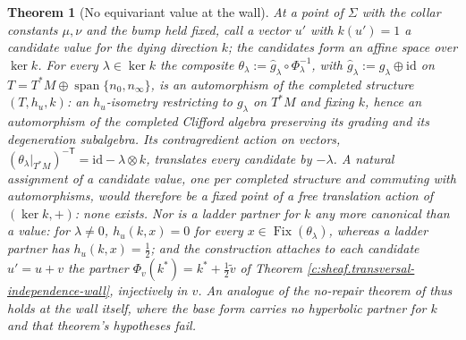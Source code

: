 \documentclass[11pt]{article}
\newtheorem{theorem}{Theorem}[section]
\theoremstyle{definition}
\theoremstyle{plain}
\newcommand{\changedmark}[2]{\marginpar{\raggedright\scriptsize\color{#1}#2}}
\providecommand{\Sig}{}\renewcommand{\Sig}{\Sigma}
\providecommand{\id}{}\renewcommand{\id}{\mathrm{id}}
\providecommand{\nInf}{}\renewcommand{\nInf}{n_\infty}
\providecommand{\nO}{}\renewcommand{\nO}{n_0}
\begin{document}
\begin{theorem}[No equivariant value at the wall]\label{c:sheaf.no-equivariant-value-wall}
\changedmark{gray}{reworded}
At a point of $\Sig$ with the collar constants $\mu, \nu$ and the bump held fixed, call a vector $u'$ with $k(u') = 1$ a \emph{candidate value} for the dying direction $k$; the candidates form an affine space over $\ker k$. For every $\lambda \in \ker k$ the composite $\theta_\lambda := \hat g_\lambda \circ \Phi_\lambda^{-1}$, with $\hat g_\lambda := g_\lambda \oplus \id$ on $T = T^*M \oplus \operatorname{span}\{\nO, \nInf\}$, is an automorphism of the completed structure $(T, h_u, k)$: an $h_u$-isometry restricting to $g_\lambda$ on $T^*M$ and fixing $k$, hence an automorphism of the completed Clifford algebra preserving its grading and its degeneration subalgebra. Its contragredient action on vectors, $(\theta_\lambda|_{T^*M})^{-\mathsf{T}} = \id - \lambda \otimes k$, translates every candidate by $-\lambda$. A natural assignment of a candidate value, one per completed structure and commuting with automorphisms, would therefore be a fixed point of a free translation action of $(\ker k, +)$: none exists. Nor is a ladder partner for $k$ any more canonical than a value: for $\lambda \neq 0$, $h_u(k, x) = 0$ for every $x \in \operatorname{Fix}(\theta_\lambda)$, whereas a ladder partner has $h_u(k, x) = \tfrac12$; and the construction attaches to each candidate $u' = u + v$ the partner $\Phi_v(k^*) = k^* + \tfrac12\tilde v$ of Theorem \ref{c:sheaf.transversal-independence-wall}, injectively in $v$. An analogue of the no-repair theorem of \cite[Thm.~4.2]{ButlerT1} thus holds at the wall itself, where the base form carries no hyperbolic partner for $k$ and that theorem's hypotheses fail.
\end{theorem}
\end{document}
